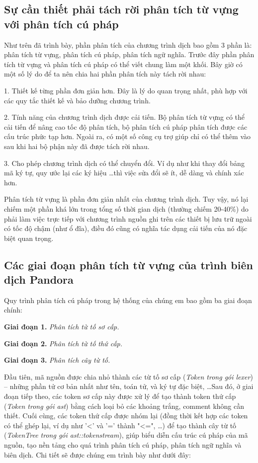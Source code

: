 \subsection{Sự cần thiết phải tách rời phân tích từ vựng với phân tích cú pháp}
Như trên đã trình bày, phần phân tích của chương trình dịch bao gồm 3 phần là: phân tích từ vựng, phân tích cú pháp, phân tích ngữ nghĩa. Trước đây phần phân tích từ vựng và phân tích cú pháp có thể viết chung làm một khối. Bây giờ có một số lý do để ta nên chia hai phần phân tích này tách rời nhau:

1. Thiết kế từng phần đơn giản hơn. Đây là lý do quan trọng nhất, phù hợp với các quy tắc thiết kế và bảo dưỡng chương trình.

2. Tính năng của chương trình dịch được cải tiến. Bộ phân tích từ vựng có thể cải tiến để nâng cao tốc độ phân tích, bộ phân tích cú pháp phân tích được các cấu trúc phức tạp hơn. Ngoài ra, có một số công cụ trợ giúp chỉ có thể thêm vào sau khi hai bộ phận này đã được tách rời nhau.

3. Cho phép chương trình dịch có thể chuyển đổi. Ví dụ như khi thay đổi bảng mã ký tự, quy ước lại các ký hiệu \dots\space thì việc sửa đổi sẽ ít, dễ dàng và chính xác hơn.

Phân tích từ vựng là phần đơn giản nhất của chương trình dịch. Tuy vậy, nó lại chiếm một phần khá lớn trong tổng số thời gian dịch (thường chiếm 20-40\%) do phải làm việc trực tiếp với chương trình nguồn ghi trên các thiết bị lưu trữ ngoài có tốc độ chậm (như ổ đĩa), điều đó cũng có nghĩa tác dụng cải tiến của nó đặc biệt quan trọng.

\subsection{Các giai đoạn phân tích từ vựng của trình biên dịch Pandora}
Quy trình phân tích cú pháp trong hệ thống của chúng em bao gồm ba giai đoạn chính:

\textbf{Giai đoạn 1.} \textit{Phân tích từ tố sơ cấp.}

\textbf{Giai đoạn 2.} \textit{Phân tích từ tố thứ cấp.}

\textbf{Giai đoạn 3.} \textit{Phân tích cây từ tố.}

Đầu tiên, mã nguồn được chia nhỏ thành các từ tố sơ cấp (\textit{Token trong gói lexer}) – những phần tử cơ bản nhất như tên, toán tử, và ký tự đặc biệt, \dots Sau đó, ở giai đoạn tiếp theo, các token sơ cấp này được xử lý để tạo thành token thứ cấp (\textit{Token trong gói ast}) bằng cách loại bỏ các khoảng trắng, comment không cần thiết. Cuối cùng, các token thứ cấp được nhóm lại (đồng thời kết hợp các token có thể ghép lại, ví dụ như '<' và '=' thành "<=", \dots) để tạo thành cây từ tố (\textit{TokenTree trong gói ast::tokenstream}), giúp biểu diễn cấu trúc cú pháp của mã nguồn, tạo nền tảng cho quá trình phân tích cú pháp, phân tích ngữ nghĩa và biên dịch. Chi tiết sẽ được chúng em trình bày như dưới đây:
